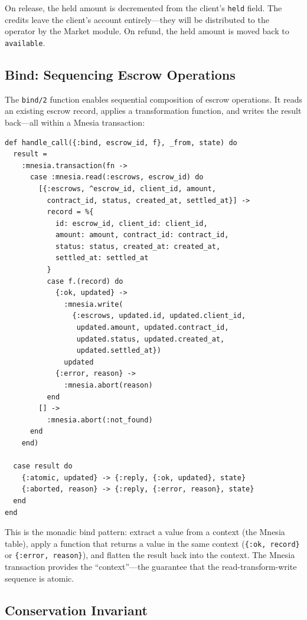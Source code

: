 \documentclass[12pt,a4paper]{article}
\theoremstyle{plain}
\theoremstyle{definition}
\begin{document}
On release, the held amount is decremented from the client's \texttt{held} field. The credits leave the client's account entirely---they will be distributed to the operator by the Market module. On refund, the held amount is moved back to \texttt{available}.

\subsection{Bind: Sequencing Escrow Operations}

The \texttt{bind/2} function enables sequential composition of escrow operations. It reads an existing escrow record, applies a transformation function, and writes the result back---all within a Mnesia transaction:

\begin{lstlisting}[caption={Escrow bind for sequential composition},label={lst:escrow-bind}]
def handle_call({:bind, escrow_id, f}, _from, state) do
  result =
    :mnesia.transaction(fn ->
      case :mnesia.read(:escrows, escrow_id) do
        [{:escrows, ^escrow_id, client_id, amount,
          contract_id, status, created_at, settled_at}] ->
          record = %{
            id: escrow_id, client_id: client_id,
            amount: amount, contract_id: contract_id,
            status: status, created_at: created_at,
            settled_at: settled_at
          }
          case f.(record) do
            {:ok, updated} ->
              :mnesia.write(
                {:escrows, updated.id, updated.client_id,
                 updated.amount, updated.contract_id,
                 updated.status, updated.created_at,
                 updated.settled_at})
              updated
            {:error, reason} ->
              :mnesia.abort(reason)
          end
        [] ->
          :mnesia.abort(:not_found)
      end
    end)

  case result do
    {:atomic, updated} -> {:reply, {:ok, updated}, state}
    {:aborted, reason} -> {:reply, {:error, reason}, state}
  end
end
\end{lstlisting}

This is the monadic bind pattern: extract a value from a context (the Mnesia table), apply a function that returns a value in the same context (\texttt{\{:ok, record\}} or \texttt{\{:error, reason\}}), and flatten the result back into the context. The Mnesia transaction provides the ``context''---the guarantee that the read-transform-write sequence is atomic.

\subsection{Conservation Invariant}
\end{document}
